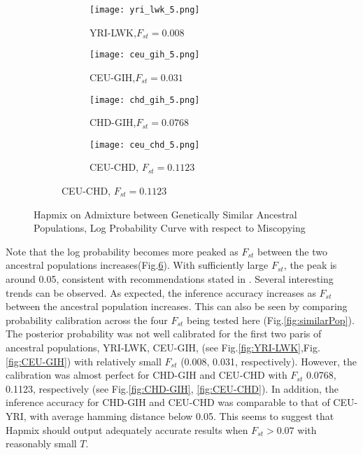 \documentclass{article}
\begin{document}
\begin{figure}
\begin{subfigure}{0.9\textwidth}
    \centering
    \begin{subfigure}{0.45\textwidth}
        \centering
        \texttt{[image: yri\_lwk\_5.png]}
        \caption{YRI-LWK,$F_{st}=0.008$}
        \label{fig:b}
    \end{subfigure}
    \hspace{1em}
    \begin{subfigure}{0.45\textwidth}
        \centering
        \texttt{[image: ceu\_gih\_5.png]}
        \caption{CEU-GIH,$F_{st}=0.031$}
        \label{fig:c}
    \end{subfigure}
    \vfill
    \begin{subfigure}{0.45\textwidth}
        \centering
        \texttt{[image: chd\_gih\_5.png]}
        \caption{CHD-GIH,$F_{st}=0.0768$}
        \label{fig:d}
    \end{subfigure}
    \hspace{1em}
    \begin{subfigure}{0.45\textwidth}
        \centering
        \texttt{[image: ceu\_chd\_5.png]}
        \caption{CEU-CHD, $F_{st}=0.1123$}
        \label{fig:d}
    \end{subfigure}
\end{subfigure}
\caption{Hapmix on Admixture between Genetically Similar Ancestral Populations, Log Probability Curve with respect to Miscopying}
\label{fig:logProb}
\end{figure}


Note that the log probability becomes more peaked as $F_{st}$ between the two ancestral populations increases(Fig.\ref{fig:logProb}). With sufficiently large $F_{st}$, the peak is around 0.05, consistent with recommendations stated in \cite{hapmix}.
Several interesting trends can be observed. As expected, the inference accuracy increases as $F_{st}$ between the ancestral population increases. This can also be seen by comparing probability calibration across the four $F_{st}$ being tested here (Fig.\ref{fig:similarPop}). The posterior probability was not well calibrated for the first two paris of ancestral populations, YRI-LWK, CEU-GIH, (see Fig.\ref{fig:YRI-LWK},Fig.\ref{fig:CEU-GIH}) with relatively small $F_{st}$ (0.008, 0.031, respectively). However, the calibration was almost perfect for CHD-GIH and CEU-CHD with $F_{st}$ 0.0768, 0.1123, respectively (see Fig.\ref{fig:CHD-GIH}, \ref{fig:CEU-CHD}). In addition, the inference accuracy for CHD-GIH and CEU-CHD was comparable to that of CEU-YRI, with average hamming distance below 0.05. This seems to suggest that Hapmix should output adequately accurate results when $F_{st} > 0.07$ with reasonably small $T$.
    
\end{document}
